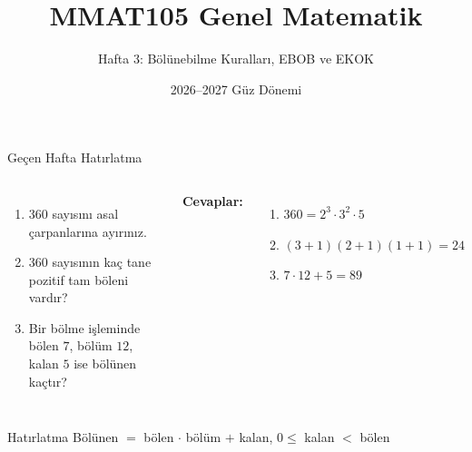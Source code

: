 \documentclass[aspectratio=169,11pt,handout]{beamer}
\title[MMAT105 -- Hafta 3]{MMAT105 Genel Matematik}
\subtitle{Hafta 3: Bölünebilme Kuralları, EBOB ve EKOK}
\author{}
\date{2026--2027 Güz Dönemi}
\begin{document}
\begin{frame}
\titlepage
\end{frame}


\begin{frame}{Geçen Hafta Hatırlatma}
\begin{columns}[t]
\begin{enumerate}
\item \(360\) sayısını asal çarpanlarına ayırınız.
\item \(360\) sayısının kaç tane pozitif tam böleni vardır?
\item Bir bölme işleminde bölen \(7\), bölüm \(12\), kalan \(5\) ise bölünen kaçtır?
\end{enumerate}
\pause
\textbf{Cevaplar:}
\begin{enumerate}
\item \(360=2^3\cdot 3^2\cdot 5\)
\item \((3+1)(2+1)(1+1)=24\)
\item \(7\cdot 12+5=89\)
\end{enumerate}
\end{columns}
\vspace{6pt}
\begin{block}{Hatırlatma}
Bölünen \(=\) bölen \(\cdot\) bölüm \(+\) kalan, \qquad \(0\le\) kalan \(<\) bölen
\end{block}
\end{frame}
\end{document}
